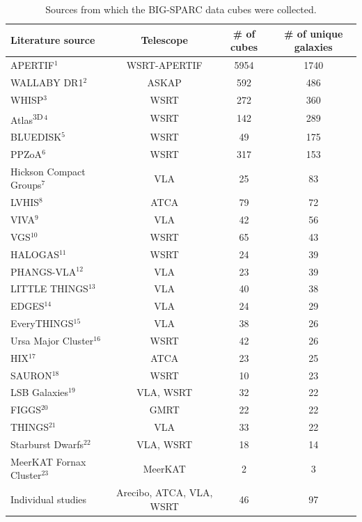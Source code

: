 \documentclass{iau}
\begin{document}
\begin{table}[t]
    \footnotesize
    \captionsetup{singlelinecheck=off, labelfont=bf, font=footnotesize, labelformat=simple}
    \caption{Sources from which the BIG-SPARC data cubes were collected.}
    \vspace{-.4cm}
    \begin{center}
    \label{TabSources}
    \begin{tabular}{lccc}
        \hline 
        Literature source & Telescope & \# of cubes & \# of unique galaxies\\ \hline
        APERTIF$^1$ & WSRT-APERTIF & 5954 & 1740\\
        WALLABY DR1$^2$ & ASKAP & 592 & 486\\
        WHISP$^3$ & WSRT & 272 & 360\\
        Atlas\textsuperscript{3D}$^{\,4}$ & WSRT & 142 & 289\\
        BLUEDISK$^5$ & WSRT & 49 & 175\\
        PPZoA$^6$ & WSRT & 317 & 153\\
        Hickson Compact Groups$^7$ & VLA & 25 & 83\\
        LVHIS$^8$ & ATCA & 79 & 72\\
        VIVA$^9$ & VLA & 42 & 56\\
        VGS$^{10}$ & WSRT & 65 & 43\\
        HALOGAS$^{11}$ & WSRT & 24 & 39\\
        PHANGS-VLA$^{12}$ & VLA & 23 & 39\\
        LITTLE THINGS$^{13}$ & VLA & 40 & 38\\
        EDGES$^{14}$ & VLA & 24 & 29\\
        EveryTHINGS$^{15}$ & VLA & 38 & 26\\
        Ursa Major Cluster$^{16}$ & WSRT & 42 & 26\\
        HIX$^{17}$ & ATCA & 23 & 25\\
        SAURON$^{18}$ & WSRT & 10 & 23\\
        LSB Galaxies$^{19}$ & VLA, WSRT & 32 & 22\\
        FIGGS$^{20}$ & GMRT & 22 & 22\\
        THINGS$^{21}$ & VLA & 33 & 22\\
        Starburst Dwarfs$^{22}$ & VLA, WSRT & 18 & 14\\
        MeerKAT Fornax Cluster$^{23}$ & MeerKAT & 2 & 3\\
        Individual studies & Arecibo, ATCA, VLA, WSRT & 46 & 97\\

\end{tabular}
\end{center}
\end{table}
\end{document}
